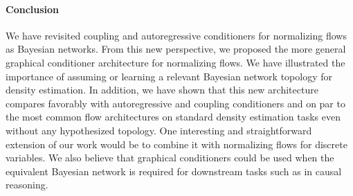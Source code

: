 \documentclass[twoside]{article}
\newcommand{\gilles}[1]{\textcolor{red}{[GL: #1]}}
\begin{document}

\paragraph{Conclusion}
We have revisited coupling and autoregressive conditioners for normalizing flows as Bayesian networks.
From this new perspective, we proposed the more general graphical conditioner architecture for normalizing flows. We have illustrated the importance of assuming or learning a relevant Bayesian network topology for density estimation. In addition, we have shown that this new architecture compares favorably with autoregressive and coupling conditioners and on par to the most common flow architectures on standard density estimation tasks even without any hypothesized topology. One interesting and straightforward extension of our work would be to combine it with normalizing flows for discrete variables.
We also believe that graphical conditioners could be used when the equivalent Bayesian network is required for downstream tasks such as in causal reasoning.
\end{document}
